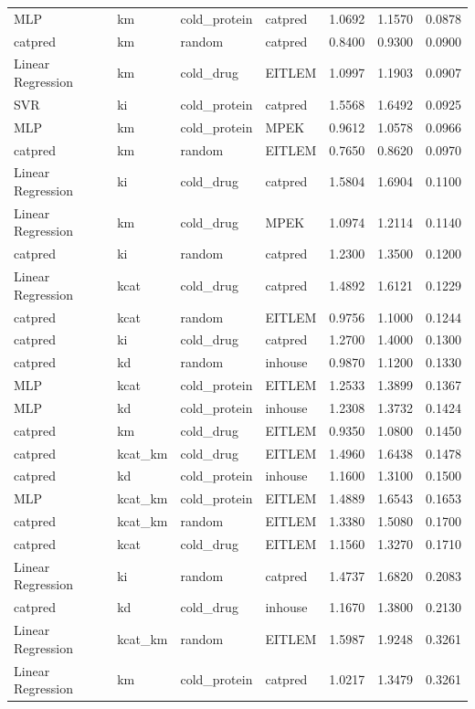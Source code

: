 \begin{tabular}{llllrrr}
MLP & km & cold_protein & catpred & 1.0692 & 1.1570 & 0.0878 \\
catpred & km & random & catpred & 0.8400 & 0.9300 & 0.0900 \\
Linear Regression & km & cold_drug & EITLEM & 1.0997 & 1.1903 & 0.0907 \\
SVR & ki & cold_protein & catpred & 1.5568 & 1.6492 & 0.0925 \\
MLP & km & cold_protein & MPEK & 0.9612 & 1.0578 & 0.0966 \\
catpred & km & random & EITLEM & 0.7650 & 0.8620 & 0.0970 \\
Linear Regression & ki & cold_drug & catpred & 1.5804 & 1.6904 & 0.1100 \\
Linear Regression & km & cold_drug & MPEK & 1.0974 & 1.2114 & 0.1140 \\
catpred & ki & random & catpred & 1.2300 & 1.3500 & 0.1200 \\
Linear Regression & kcat & cold_drug & catpred & 1.4892 & 1.6121 & 0.1229 \\
catpred & kcat & random & EITLEM & 0.9756 & 1.1000 & 0.1244 \\
catpred & ki & cold_drug & catpred & 1.2700 & 1.4000 & 0.1300 \\
catpred & kd & random & inhouse & 0.9870 & 1.1200 & 0.1330 \\
MLP & kcat & cold_protein & EITLEM & 1.2533 & 1.3899 & 0.1367 \\
MLP & kd & cold_protein & inhouse & 1.2308 & 1.3732 & 0.1424 \\
catpred & km & cold_drug & EITLEM & 0.9350 & 1.0800 & 0.1450 \\
catpred & kcat_km & cold_drug & EITLEM & 1.4960 & 1.6438 & 0.1478 \\
catpred & kd & cold_protein & inhouse & 1.1600 & 1.3100 & 0.1500 \\
MLP & kcat_km & cold_protein & EITLEM & 1.4889 & 1.6543 & 0.1653 \\
catpred & kcat_km & random & EITLEM & 1.3380 & 1.5080 & 0.1700 \\
catpred & kcat & cold_drug & EITLEM & 1.1560 & 1.3270 & 0.1710 \\
Linear Regression & ki & random & catpred & 1.4737 & 1.6820 & 0.2083 \\
catpred & kd & cold_drug & inhouse & 1.1670 & 1.3800 & 0.2130 \\
Linear Regression & kcat_km & random & EITLEM & 1.5987 & 1.9248 & 0.3261 \\
Linear Regression & km & cold_protein & catpred & 1.0217 & 1.3479 & 0.3261 \\

\end{tabular}
